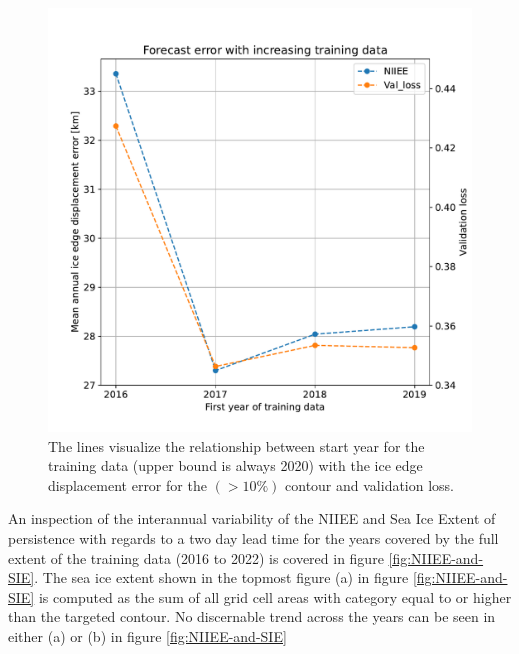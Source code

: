 \documentclass[../main/thesis]{subfiles}
\begin{document}
\begin{figure}
    \centering
    \includegraphics[width=.9\textwidth]{years_start.pdf}
    \caption{\label{fig:append_years}The lines visualize the relationship between start year for the training data (upper bound is always 2020) with the ice edge displacement error for the $(> 10\%)$ contour and validation loss.}
\end{figure}

An inspection of the interannual variability of the NIIEE and Sea Ice Extent of persistence with regards to a two day lead time for the years covered by the full extent of the training data (2016 to 2022) is covered in figure \ref{fig:NIIEE-and-SIE}. The sea ice extent shown in the topmost figure (a) in figure \ref{fig:NIIEE-and-SIE} is computed as the sum of all grid cell areas with category equal to or higher than the targeted contour. No discernable trend across the years can be seen in either (a) or (b) in figure \ref{fig:NIIEE-and-SIE} 
\end{document}

